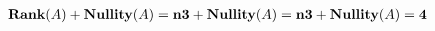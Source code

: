\documentclass[preview]{standalone}
\begin{document}
\begin{align*}
\textbf{\text{Rank}}(A) + \textbf{\text{Nullity}}(A) = \textbf{n} \textbf{\text{3}} + \textbf{\text{Nullity}}(A) = \textbf{n} \textbf{\text{3}} + \textbf{\text{Nullity}}(A) = \textbf{4}
\end{align*}
\end{document}
